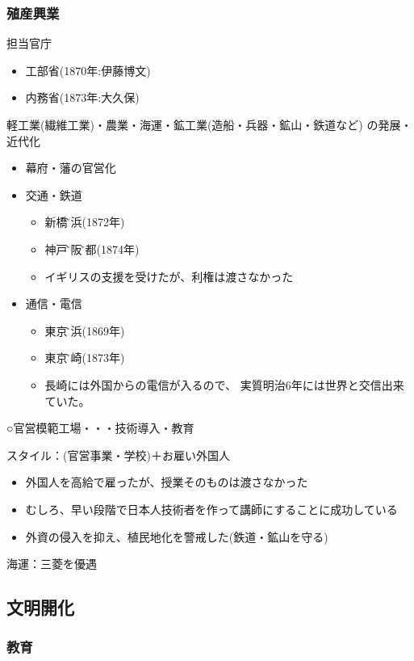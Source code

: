 \documentclass[12pt,fleqn]{ltjsarticle}
\begin{document}
\subsubsection{殖産興業}
担当官庁
\begin{itemize}
\item 工部省(1870年:伊藤博文)
\item 内務省(1873年:大久保)
\end{itemize}
軽工業(繊維工業)・農業・海運・鉱工業(造船・兵器・鉱山・鉄道など)
の発展・近代化
\begin{itemize}
\item 幕府・藩の官営化
\item 交通・鉄道
\begin{itemize}
\item 新橋\~ 横浜(1872年)
\item 神戸\~ 大阪\~ 京都(1874年)
\item イギリスの支援を受けたが、利権は渡さなかった
\end{itemize}
\item 通信・電信
\begin{itemize}
\item 東京\~ 横浜(1869年)
\item 東京\~ 長崎(1873年)
\item 長崎には外国からの電信が入るので、
実質明治6年には世界と交信出来ていた。
\end{itemize}
\end{itemize}
○官営模範工場・・・技術導入・教育

スタイル：(官営事業・学校)＋お雇い外国人
\begin{itemize}
\item 外国人を高給で雇ったが、授業そのものは渡さなかった
\item むしろ、早い段階で日本人技術者を作って講師にすることに成功している
\item 外資の侵入を抑え、植民地化を警戒した(鉄道・鉱山を守る)
\end{itemize}
海運：三菱を優遇

\subsection{文明開化}
\subsubsection{教育}
\end{document}
